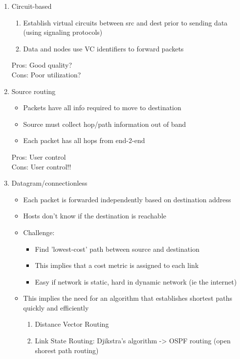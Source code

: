 \documentclass[11pt]{article}
\begin{document}
\begin{enumerate}
\item Circuit-based
\label{sec:orgheadline70}
\begin{enumerate}
\item Establish virtual circuits between src and dest prior to sending
data (using signaling protocols)
\item Data and nodes use VC identifiers to forward packets
\end{enumerate}
Pros: Good quality?\\
Cons: Poor utilization?

\item Source routing
\label{sec:orgheadline71}
\begin{itemize}
\item Packets have all info required to move to destination
\item Source must collect hop/path information out of band
\item Each packet has all hops from end-2-end
\end{itemize}
Pros: User control\\
Cons: User control!!

\item Datagram/connectionless
\label{sec:orgheadline72}
\begin{itemize}
\item Each packet is forwarded independently based on destination address
\item Hosts don't know if the destination is reachable
\item Challenge:
\begin{itemize}
\item Find 'lowest-cost' path between source and destination
\item This implies that a cost metric is assigned to each link
\item Easy if network is static, hard in dynamic network (ie the internet)
\end{itemize}
\item This implies the need for an algorithm that establishes shortest
paths quickly and efficiently
\begin{enumerate}
\item Distance Vector Routing
\item Link State Routing: Djikstra's algorithm -> OSPF routing (open
shorest path routing)
\end{enumerate}
\end{itemize}


\end{enumerate}
\end{document}
